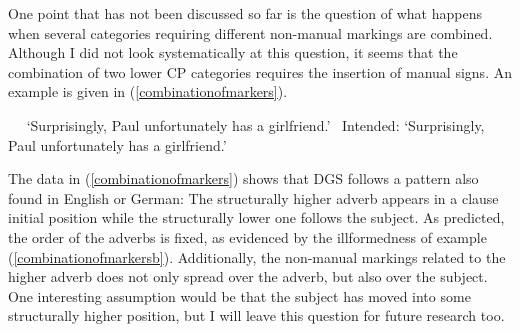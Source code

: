 \begin{exe}
\ex \label{ex:lowercp}
\begin{adjustbox}{max width=0.9\textwidth}

\end{adjustbox}
\end{exe}

One point that has not been discussed so far is the question of what happens when several categories requiring different non-manual markings are combined. Although I did not look systematically at this question, it seems that the combination of two lower CP categories requires the insertion of manual signs. An example is given in (\ref{combinationofmarkers}). 

\begin{exe}
\ex\label{combinationofmarkers}\begin{xlist}
\ex \textcolor{white}{*} 
\glt \textcolor{white}{*}`Surprisingly, Paul unfortunately has a girlfriend.'\label{combinationofmarkersa}
\ex * 
\glt \textcolor{white}{*}Intended: `Surprisingly, Paul unfortunately has a girlfriend.'\label{combinationofmarkersb}
\end{xlist}
\end{exe}

\noindent The data in (\ref{combinationofmarkers}) shows that DGS follows a pattern also found in English or German: The structurally higher adverb appears in a clause initial position while the structurally lower one follows the subject. As predicted, the order of the adverbs is fixed, as evidenced by the illformedness of example (\ref{combinationofmarkersb}). Additionally, the non-manual markings related to the higher adverb does not only spread over the adverb, but also over the subject. One interesting assumption would be that the subject has moved into some structurally higher position, but I will leave this question for future research too.

